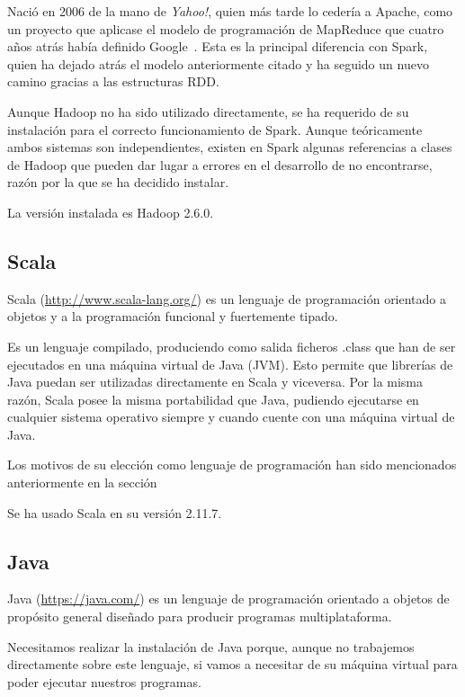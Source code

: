 Nació en 2006 de la mano de \textit{Yahoo!}, quien más tarde lo cedería a Apache, como un proyecto que aplicase el modelo de programación de MapReduce que cuatro años atrás había definido Google~\cite{DatabricksSlides}. Esta es la principal diferencia con Spark, quien ha dejado atrás el modelo anteriormente citado y ha seguido un nuevo camino gracias a las estructuras RDD.

Aunque Hadoop no ha sido utilizado directamente, se ha requerido de su instalación para el correcto funcionamiento de Spark. Aunque teóricamente ambos sistemas son independientes, existen en Spark algunas referencias a clases de Hadoop que pueden dar lugar a errores en el desarrollo de no encontrarse, razón por la que se ha decidido instalar.

La versión instalada es Hadoop 2.6.0.

\subsection{Scala}

Scala (\url{http://www.scala-lang.org/}) es un lenguaje de programación orientado a objetos y a la programación funcional y fuertemente tipado.

Es un lenguaje compilado, produciendo como salida ficheros .class que han de ser ejecutados en una máquina virtual de Java (JVM). Esto permite que librerías de Java puedan ser utilizadas directamente en Scala y viceversa. Por la misma razón, Scala posee la misma portabilidad que Java, pudiendo ejecutarse en cualquier sistema operativo siempre y cuando cuente con una máquina virtual de Java. 

Los motivos de su elección como lenguaje de programación han sido mencionados anteriormente en la sección 

Se ha usado Scala en su versión 2.11.7.

\subsection{Java}

Java (\url{https://java.com/}) es un lenguaje de programación orientado a objetos de propósito general diseñado para producir programas multiplataforma.

Necesitamos realizar la instalación de Java porque, aunque no trabajemos directamente sobre este lenguaje, si vamos a necesitar de su máquina virtual para poder ejecutar nuestros programas.

